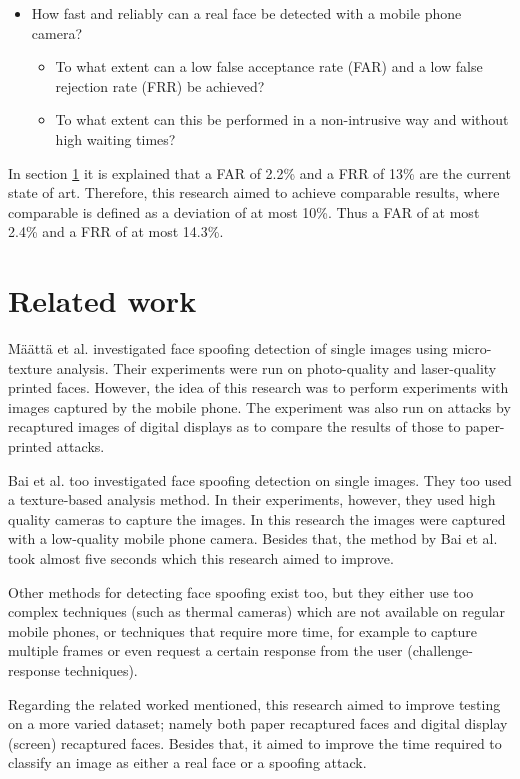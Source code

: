 \documentclass{sig-alternate-br}
\begin{document}
\begin{itemize}
	\item How fast and reliably can a real face be detected with a mobile phone camera?
	\begin{itemize}
		\item To what extent can a low false acceptance rate (FAR) and a low false rejection rate (FRR) be achieved?
		\item To what extent can this be performed in a non-intrusive way and without high waiting times?
	\end{itemize}
\end{itemize}
In section \ref{related} it is explained that a FAR of 2.2\% and a FRR of 13\% are the current state of art. Therefore, this research aimed to achieve comparable results, where comparable is defined as a deviation of at most 10\%. Thus a FAR of at most 2.4\% and a FRR of at most 14.3\%.

\section{Related work} \label{related}
M\"a\"att\"a et al. \cite{maatta2011face} investigated face spoofing detection of single images using micro-texture analysis. Their experiments were run on photo-quality and laser-quality printed faces. However, the idea of this research was to perform experiments with images captured by the mobile phone. The experiment was also run on attacks by recaptured images of digital displays as to compare the results of those to paper-printed attacks.

Bai et al. \cite{bai2010physics} too investigated face spoofing detection on single images. They too used a texture-based analysis method. In their experiments, however, they used high quality cameras to capture the images. In this research the images were captured with a low-quality mobile phone camera. Besides that, the method by Bai et al. took almost five seconds which this research aimed to improve.

Other methods for detecting face spoofing exist too, but they either use too complex techniques (such as thermal cameras) which are not available on regular mobile phones, or techniques that require more time, for example to capture multiple frames or even request a certain response from the user (challenge-response techniques).

Regarding the related worked mentioned, this research aimed to improve testing on a more varied dataset; namely both paper recaptured faces and digital display (screen) recaptured faces. Besides that, it aimed to improve the time required to classify an image as either a real face or a spoofing attack.
\end{document}
